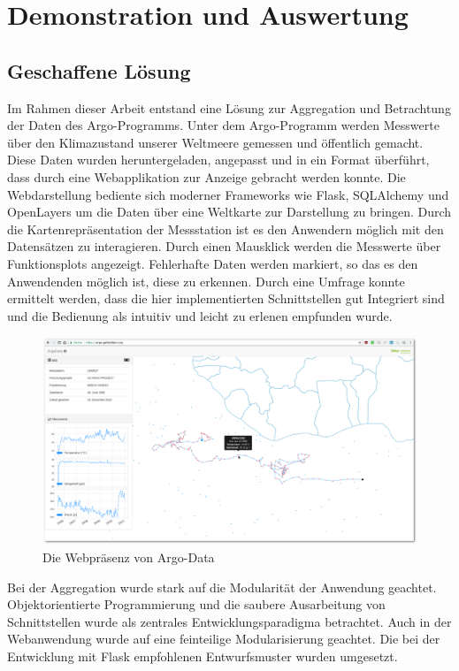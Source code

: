 \section{Demonstration und Auswertung}


\subsection{Geschaffene Lösung}

Im Rahmen dieser Arbeit entstand eine Lösung zur Aggregation und Betrachtung der Daten des Argo-Programms. Unter dem Argo-Programm werden Messwerte über den Klimazustand unserer Weltmeere gemessen und öffentlich gemacht. Diese Daten wurden heruntergeladen, angepasst und in ein Format überführt, dass durch eine Webapplikation zur Anzeige gebracht werden konnte. Die Webdarstellung bediente sich moderner Frameworks wie Flask, SQLAlchemy und OpenLayers um die Daten über eine Weltkarte zur Darstellung zu bringen. Durch die Kartenrepräsentation der Messstation ist es den Anwendern möglich mit den Datensätzen zu interagieren. Durch einen Mausklick werden die Messwerte über Funktionsplots angezeigt.  Fehlerhafte Daten werden markiert, so das es den Anwendenden möglich ist, diese zu erkennen. Durch eine Umfrage konnte ermittelt werden, dass die hier implementierten Schnittstellen gut Integriert sind und die Bedienung als intuitiv und leicht zu erlenen empfunden wurde.

\begin{figure}[H]
 \centering
 \includegraphics[width=\textwidth]{pix/argodata_complete.png}
 \caption{Die Webpräsenz von Argo-Data}
 \label{fig:argodataWeb}
\end{figure}

Bei der Aggregation wurde stark auf die Modularität der Anwendung geachtet. Objektorientierte Programmierung und die saubere Ausarbeitung von Schnittstellen wurde als zentrales Entwicklungsparadigma betrachtet. Auch in der Webanwendung wurde auf eine feinteilige Modularisierung geachtet. Die bei der Entwicklung mit Flask empfohlenen Entwurfsmuster wurden umgesetzt.


